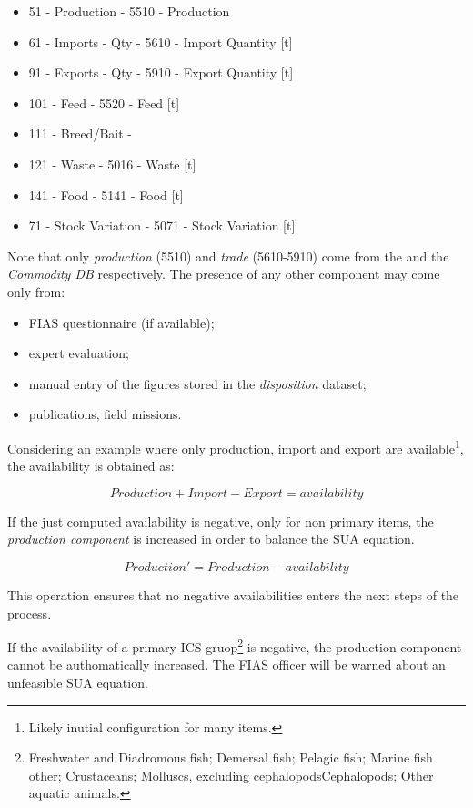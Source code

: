 \documentclass[nojss]{jss}
\begin{document}
\begin{itemize}

\item 51 - Production      -     5510 - Production                         
\item 61 - Imports - Qty   -     5610 - Import Quantity [t]                
\item 91 - Exports - Qty   -     5910 - Export Quantity [t]                
\item 101 - Feed           -    5520  - Feed [t]                            
\item 111 - Breed/Bait     -     
\item 121 -	Waste          -    5016  - Waste [t]                          
\item 141 -	Food           -    5141  - Food [t]                           
\item 71  -	Stock Variation -   5071  - Stock Variation [t]               
\end{itemize}

Note that only \textit{production} (5510) and \textit{trade} (5610-5910) come from the  and the \textit{Commodity DB} respectively. The presence of any other component may come only from:

\begin{itemize}
\item FIAS questionnaire (if available);
\item expert evaluation;
\item manual entry of the figures stored in the \textit{disposition} dataset;
\item publications, field missions.
\end{itemize}

Considering an example where only production, import and export are available\footnote{Likely inutial configuration for many items.}, the availability is obtained as:

$$
Production+Import-Export= availability
$$

If the just computed availability is negative, only for non primary items, the \textit{production component} is increased in order to balance the SUA equation.

$$
Production'=Production-availability
$$

This operation ensures that no negative availabilities enters the next steps of the process.




If the availability of a primary ICS gruop\footnote{Freshwater and Diadromous fish; Demersal fish; Pelagic fish; Marine fish other; Crustaceans; Molluscs, excluding cephalopodsCephalopods; Other aquatic animals.} is negative, the production component cannot be authomatically increased. The FIAS officer will be warned about an unfeasible SUA equation.
\end{document}
